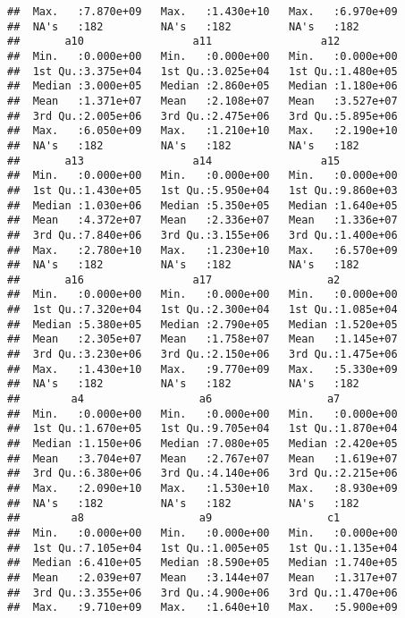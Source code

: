 \documentclass[
]{article}
\begin{document}
\begin{verbatim}
##  Max.   :7.870e+09   Max.   :1.430e+10   Max.   :6.970e+09  
##  NA's   :182         NA's   :182         NA's   :182        
##       a10                 a11                 a12           
##  Min.   :0.000e+00   Min.   :0.000e+00   Min.   :0.000e+00  
##  1st Qu.:3.375e+04   1st Qu.:3.025e+04   1st Qu.:1.480e+05  
##  Median :3.000e+05   Median :2.860e+05   Median :1.180e+06  
##  Mean   :1.371e+07   Mean   :2.108e+07   Mean   :3.527e+07  
##  3rd Qu.:2.005e+06   3rd Qu.:2.475e+06   3rd Qu.:5.895e+06  
##  Max.   :6.050e+09   Max.   :1.210e+10   Max.   :2.190e+10  
##  NA's   :182         NA's   :182         NA's   :182        
##       a13                 a14                 a15           
##  Min.   :0.000e+00   Min.   :0.000e+00   Min.   :0.000e+00  
##  1st Qu.:1.430e+05   1st Qu.:5.950e+04   1st Qu.:9.860e+03  
##  Median :1.030e+06   Median :5.350e+05   Median :1.640e+05  
##  Mean   :4.372e+07   Mean   :2.336e+07   Mean   :1.336e+07  
##  3rd Qu.:7.840e+06   3rd Qu.:3.155e+06   3rd Qu.:1.400e+06  
##  Max.   :2.780e+10   Max.   :1.230e+10   Max.   :6.570e+09  
##  NA's   :182         NA's   :182         NA's   :182        
##       a16                 a17                  a2           
##  Min.   :0.000e+00   Min.   :0.000e+00   Min.   :0.000e+00  
##  1st Qu.:7.320e+04   1st Qu.:2.300e+04   1st Qu.:1.085e+04  
##  Median :5.380e+05   Median :2.790e+05   Median :1.520e+05  
##  Mean   :2.305e+07   Mean   :1.758e+07   Mean   :1.145e+07  
##  3rd Qu.:3.230e+06   3rd Qu.:2.150e+06   3rd Qu.:1.475e+06  
##  Max.   :1.430e+10   Max.   :9.770e+09   Max.   :5.330e+09  
##  NA's   :182         NA's   :182         NA's   :182        
##        a4                  a6                  a7           
##  Min.   :0.000e+00   Min.   :0.000e+00   Min.   :0.000e+00  
##  1st Qu.:1.670e+05   1st Qu.:9.705e+04   1st Qu.:1.870e+04  
##  Median :1.150e+06   Median :7.080e+05   Median :2.420e+05  
##  Mean   :3.704e+07   Mean   :2.767e+07   Mean   :1.619e+07  
##  3rd Qu.:6.380e+06   3rd Qu.:4.140e+06   3rd Qu.:2.215e+06  
##  Max.   :2.090e+10   Max.   :1.530e+10   Max.   :8.930e+09  
##  NA's   :182         NA's   :182         NA's   :182        
##        a8                  a9                  c1           
##  Min.   :0.000e+00   Min.   :0.000e+00   Min.   :0.000e+00  
##  1st Qu.:7.105e+04   1st Qu.:1.005e+05   1st Qu.:1.135e+04  
##  Median :6.410e+05   Median :8.590e+05   Median :1.740e+05  
##  Mean   :2.039e+07   Mean   :3.144e+07   Mean   :1.317e+07  
##  3rd Qu.:3.355e+06   3rd Qu.:4.900e+06   3rd Qu.:1.470e+06  
##  Max.   :9.710e+09   Max.   :1.640e+10   Max.   :5.900e+09  

\end{verbatim}
\end{document}
